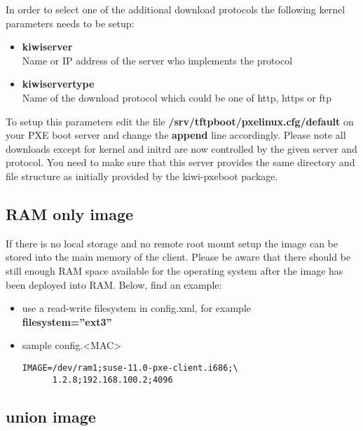 In order to select one of the additional download protocols
the following kernel parameters needs to be setup:

\begin{itemize}
\item \textbf{kiwiserver}\\
      Name or IP address of the server who implements the protocol
\item \textbf{kiwiservertype}\\
      Name of the download protocol which could be one of http, https 
      or ftp
\end{itemize}

To setup this parameters edit the file
\textbf{/srv/tftpboot/pxelinux.cfg/default} on your PXE boot server
and change the \textbf{append} line accordingly. Please note all
downloads except for kernel and initrd are now controlled by the given
server and protocol. You need to make sure that this server provides
the same directory and file structure as initially provided by
the kiwi-pxeboot package.

\subsection{RAM only image}

If there is no local storage and no remote root mount setup
the image can be stored into the main memory of the client.
Please be aware that there should be still enough RAM space
available for the operating system after the image has been
deployed into RAM. Below, find an example:

\begin{itemize}
\item use a read-write filesystem in config.xml, for example\\
      \textbf{filesystem=''ext3''}
\item sample config.<MAC>

\begin{Command}{12cm}
\begin{verbatim}
IMAGE=/dev/ram1;suse-11.0-pxe-client.i686;\
      1.2.8;192.168.100.2;4096
\end{verbatim}
\end{Command}
\end{itemize}

\subsection{union image}

